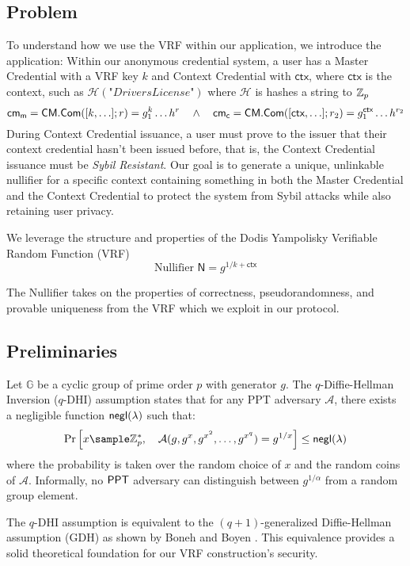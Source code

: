 \subsection{Problem}
To understand how we use the VRF within our application, we introduce the application:
Within our anonymous credential system, a user has a Master Credential with a VRF key $k$ and Context Credential with $\textsf{ctx}$, where $\textsf{ctx}$ is the context, such as $\mathcal{H}(\textit{"DriversLicense"})$ where $\mathcal{H}$ is hashes a string to $\mathbb{Z}_p$
\[
\mathsf{cm}_{\textsf{m}} = \mathsf{CM.Com}([k, \ldots]; r) = g_1^{k}\ldots h^r \quad \wedge \quad \mathsf{cm}_{\textsf{c}} = \mathsf{CM.Com}([\textsf{ctx}, \ldots]; r_2) = g_1^{\textsf{ctx}} \ldots h^{r_2}
\]
During Context Credential issuance, a user must prove to the issuer that their context credential hasn't been issued before, that is, the Context Credential issuance must be \emph{Sybil Resistant}. Our goal is to generate a unique, unlinkable nullifier for a specific context containing something in both the Master Credential and the Context Credential to protect the system from Sybil attacks while also retaining user privacy.

We leverage the structure and properties of the Dodis Yampolisky Verifiable Random Function (VRF)
\[
\text{Nullifier } \textsf{N} = g^{1/k + \textsf{ctx}}
\]

The Nullifier takes on the properties of correctness, pseudorandomness, and provable uniqueness from the VRF which we exploit in our protocol.


\subsection{Preliminaries}

\begin{definition}
Let $\mathbb{G}$ be a cyclic group of prime order $p$ with generator $g$. The $q$-Diffie-Hellman Inversion ($q$-DHI) assumption \cite{mitsunari_new_2002} states that for any PPT adversary $\mathcal{A}$, there exists a negligible function ${\mathsf{negl}(\lambda)}$ such that:
\[
\Pr\left[ x \sample \Zp^*, \quad \mathcal{A}(g, g^x, g^{x^2}, \ldots, g^{x^q}) = g^{1/x} \right] \leq \negl 
\]
where the probability is taken over the random choice of $x$ and the random coins of $\mathcal{A}$. Informally, no $\mathsf{PPT}$ adversary can distinguish between $g^{1/\alpha}$ from a random group element.
\end{definition}

\begin{remark}
The $q$-DHI assumption is equivalent to the $(q+1)$-generalized Diffie-Hellman assumption (GDH) as shown by Boneh and Boyen \cite{kanade_efficient_2004}. This equivalence provides a solid theoretical foundation for our VRF construction's security.
\end{remark}




